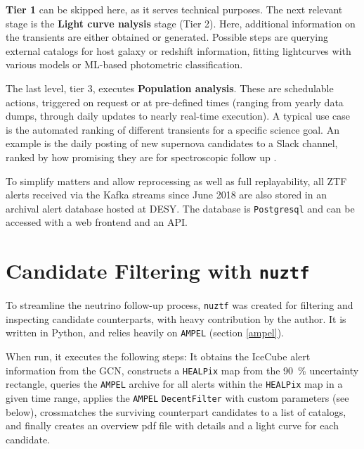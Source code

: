 \documentclass[
    a4paper, %
    fontsize=10pt, %
    twoside=true, %
    numbers=noenddot, %
    fontmethod=tex,
]{kaobook}
\begin{document}
\textbf{Tier 1} can be skipped here, as it serves technical purposes. The next relevant stage is the \textbf{Light curve nalysis} stage (Tier 2). Here, additional information on the transients are either obtained or generated. Possible steps are querying external catalogs for host galaxy or redshift information, fitting lightcurves with various models or ML-based photometric classification.

The last level, tier 3, executes \textbf{Population analysis}. These are schedulable actions, triggered on request or at pre-defined times (ranging from yearly data dumps, through daily updates to nearly real-time execution). A typical use case is the automated ranking of different transients for a specific science goal. An example is the daily posting of new supernova candidates to a Slack channel, ranked by how promising they are for spectroscopic follow up \cite{Nordin2019}.

To simplify matters and allow reprocessing as well as full replayability, all ZTF alerts received via the Kafka streams since June 2018 are also stored in an archival alert database hosted at DESY. The database is \texttt{Postgresql} and can be accessed with a web frontend and an API.

\section{Candidate Filtering with \texttt{nuztf}}
To streamline the neutrino follow-up process, \texttt{nuztf}  was created for filtering and inspecting candidate counterparts, with heavy contribution by the author. It is written in Python, and relies heavily on \texttt{AMPEL} (section \ref{ampel}).

When run, it executes the following steps: It obtains the IceCube alert information from the GCN, constructs a \texttt{HEALPix} map from the \SI{90}{\percent} uncertainty rectangle, queries the \texttt{AMPEL} archive for all alerts within the \texttt{HEALPix} map in a given time range, applies the \texttt{AMPEL} \texttt{DecentFilter} \cite{Nordin2019} with custom parameters (see below), crossmatches the surviving counterpart candidates to a list of catalogs, and finally creates an overview pdf file with details and a light curve for each candidate.
\end{document}
